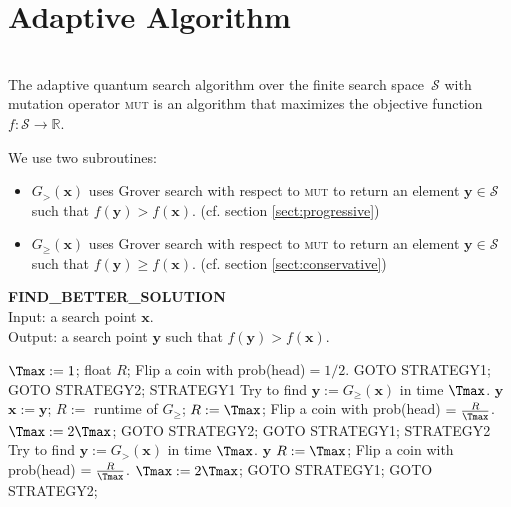 \documentclass{article}
\begin{document}
\section{Adaptive Algorithm}\label{sect:adaptive}~\\
The adaptive quantum search algorithm over the finite search
space~$\mathcal{S}$ with mutation operator \textsc{mut} is an algorithm that maximizes the
objective function $f:\mathcal{S}\to\mathbb{R}$.

We use two subroutines: 
\begin{itemize}
\item $G_>(\mathbf{x})$  uses Grover search with respect to \textsc{mut} to return an
element $\mathbf{y}\in\mathcal{S}$ such that $f(\mathbf{y})>f(\mathbf{x})$. (cf. section \ref{sect:progressive})
\item $G_{\geq}(\mathbf{x})$  uses Grover search with respect to \textsc{mut} to return an
element $\mathbf{y}\in\mathcal{S}$ such that $f(\mathbf{y})\geq f(\mathbf{x})$. (cf. section \ref{sect:conservative})
\end{itemize}

\begin{algorithm}
{\bf FIND\_BETTER\_SOLUTION}\\
Input: a search point $\mathbf{x}$.\\
Output: a search point $\mathbf{y}$ such that $f(\mathbf{y})>f(\mathbf{x})$.
\begin{algorithmic}
\STATE $\Tmax := 1$; 
\STATE float $R$; 
\STATE Flip a coin with prob(head)$=1/2$.
\STATE GOTO STRATEGY1;
\ELSE 
\STATE GOTO STRATEGY2;
\ENDIF
\STATE
\STATE STRATEGY1 
\STATE Try to find $\mathbf{y} := G_{\geq}(\mathbf{x})$ in time $\Tmax$.
\RETURN $\mathbf{y}$
\STATE $\mathbf{x} := \mathbf{y}$;
\STATE $R :=$ runtime of $G_{\geq}$;
\ELSE
\STATE $R := \Tmax$;
\ENDIF
\STATE Flip a coin with prob(head) $= \frac{R}{\Tmax}$.
\STATE $\Tmax := 2\Tmax$;
\STATE GOTO STRATEGY2;
\ELSE
\STATE GOTO STRATEGY1;
\ENDIF
\STATE
\STATE STRATEGY2 
\STATE Try to find $\mathbf{y} := G_{>}(\mathbf{x})$ in time $\Tmax$.
\RETURN $\mathbf{y}$
\ELSE
\STATE $R := \Tmax$;
\ENDIF
\STATE Flip a coin with prob(head) $= \frac{R}{\Tmax}$.
\STATE $\Tmax := 2\Tmax$;
\STATE GOTO STRATEGY1;
\ELSE
\STATE GOTO STRATEGY2;
\ENDIF
\end{algorithmic}
\end{algorithm}
\end{document}

